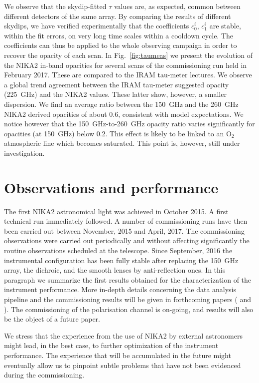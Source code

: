 \documentclass[]{aa} %
\begin{document}
We observe that the skydip-fitted $\tau$ values are, as expected, common between different detectors of the same array. By comparing the results of different skydips, we have verified experimentally that the coefficients $c^{i}_0$, $c^{i}_1$ are stable, within the fit errors, on very long time scales within a cooldown cycle. The coefficients can thus be applied to the whole observing campaign in order to recover the opacity of each scan. In Fig.~\ref{fig:taumeas} we present the evolution of the NIKA2 in-band opacities for several scans of the commissioning run held in February 2017. These are compared to the IRAM tau-meter lectures. We observe a global trend agreement between the IRAM tau-meter suggested opacity (225~GHz) and the NIKA2 values. These latter show, however, a smaller dispersion. We find an average ratio between the 150~GHz and the 260~GHz NIKA2 derived opacities of about 0.6, consistent with model expectations. We notice however that the 150~GHz-to-260~GHz opacity ratio varies significantly for opacities (at 150~GHz) below $0.2$. This effect is likely to be linked to an O$_2$ atmospheric line which becomes saturated. This point is, however, still under investigation.

\section{Observations and performance}
\label{Observations and performance}

The first NIKA2 astronomical light was achieved in October 2015. A first technical run immediately followed. A number of commissioning runs have then been carried out between November, 2015 and April, 2017. The commissioning observations were carried out periodically and without affecting significantly the routine observations scheduled at the telescope. Since September, 2016 the instrumental configuration has been fully stable after replacing the 150~GHz array, the dichroic, and the smooth lenses by anti-reflection ones.
In this paragraph we summarize the first results obtained for the characterization of the instrument performance. More in-depth details concerning the data analysis pipeline and the commissioning results will be given in forthcoming papers (\cite{pipeline} and \cite{commissioning}). The commissioning of the polarisation channel is on-going, and results will also be the object of a future paper. 

We stress that the experience from the use of NIKA2 by external astronomers might lead, in the best case, to further optimization of the instrument performance. The experience that will be accumulated in the future might eventually allow us to pinpoint subtle problems that have not been evidenced during the commissioning. 
\end{document}
